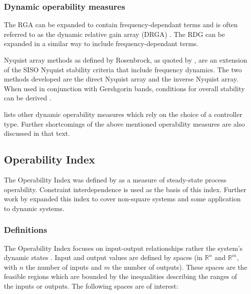\subsubsection{Dynamic operability measures}
The RGA can be expanded to contain frequency-dependant terms and is often referred to as the dynamic relative gain array (DRGA) \citep[637]{marlin}. 
The RDG \citep{artrdg} can be expanded in a similar way to include frequency-dependant terms.

Nyquist array methods as defined by Rosenbrock, as quoted by \citet[92]{skogestad}, are an extension of the SISO Nyquist stability criteria that include frequency dynamics. 
The two methods developed are the direct Nyquist array and the inverse Nyquist array. 
When used in conjunction with Gershgorin bands, conditions for overall stability can be derived \citep[440]{skogestad}.

\citet{vinsonphd} lists other dynamic operability measures which rely on the choice of a controller type. Further shortcomings of the above mentioned operability measures are also discussed in that text. 

\subsection{Operability Index}\label{sec:oi}
The Operability Index was defined by \citet{vinsonphd} as a measure of steady-state process operability. 
Constraint interdependence is used as the basis of this index. 
Further work by \citet{limaphd} expanded this index to cover non-square systems and some application to dynamic systems.%
%

\subsubsection{Definitions}
The Operability Index focuses on input-output relationships rather the system's dynamic states \citep{vinsonphd}. 
Input and output values are defined by spaces (in $\mathbb{R}^n$ and $\mathbb{R}^m$, with $n$ the number of inputs and $m$ the number of outputs). 
These spaces are the feasible regions which are bounded by the inequalities describing the ranges of the inputs or outputs. 
The following spaces are of interest:%
%
%
%

